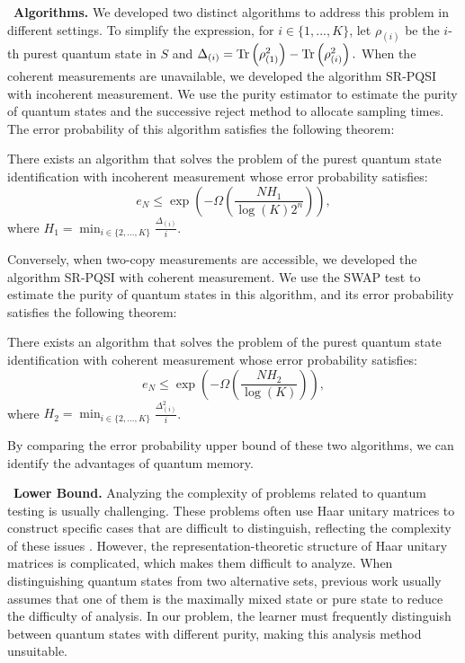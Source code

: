 \textbullet \  \textbf{Algorithms.} We developed two distinct algorithms to address this problem in different settings. To simplify the expression, for $i \in \{1,...,K\}$, let $\rho_{(i)}$ be the $i$-th purest quantum state in $S$ and
    $\Delta_{(i)} =\mathrm{Tr}\left(\rho^2_{(1)}\right) - \mathrm{Tr}\left(\rho^2_{(i)}\right).$
When the coherent measurements are unavailable, we developed the algorithm SR-PQSI with incoherent measurement. We use the purity estimator to estimate the purity of quantum states and the successive reject method to allocate sampling times. The error probability of this algorithm satisfies the following theorem:

\begin{theorem} 
    There exists an algorithm that solves the problem of the purest quantum state identification with incoherent measurement whose error probability satisfies:
    \begin{equation}
        e_N \leq \exp\left(- \Omega\left(\frac{N H_1}{\log(K) 2^n }\right) \right),
    \end{equation}
    where $H_1 = \min_{i \in \{2,...,K\}} \frac{\Delta_{(i)}}{i}$.
\end{theorem}
    
Conversely, when two-copy measurements are accessible, we developed the algorithm SR-PQSI with coherent measurement. We use the SWAP test to estimate the purity of quantum states in this algorithm, and its error probability satisfies the following theorem:
    
\begin{theorem} 
    There exists an algorithm that solves the problem of the purest quantum state identification with coherent measurement whose error probability satisfies:
    \begin{equation}
        e_N \leq \exp\left(- \Omega\left(\frac{N H_2}{\log(K) }\right) \right),
    \end{equation}
    where $H_2 = \min_{i \in \{2,...,K\}} \frac{\Delta^2_{(i)}}{i}$.
\end{theorem}

By comparing the error probability upper bound of these two algorithms, we can identify the advantages of quantum memory.

\textbullet \  \textbf{Lower Bound.} Analyzing the complexity of problems related to quantum testing is usually challenging. These problems often use Haar unitary matrices to construct specific cases that are difficult to distinguish, reflecting the complexity of these issues \cite{anshu2022distributed, gong2024sample}. However, the representation-theoretic structure of Haar unitary matrices is complicated, which makes them difficult to analyze. When distinguishing quantum states from two alternative sets, previous work usually assumes that one of them is the maximally mixed state or pure state to reduce the difficulty of analysis. In our problem, the learner must frequently distinguish between quantum states with different purity, making this analysis method unsuitable. 

